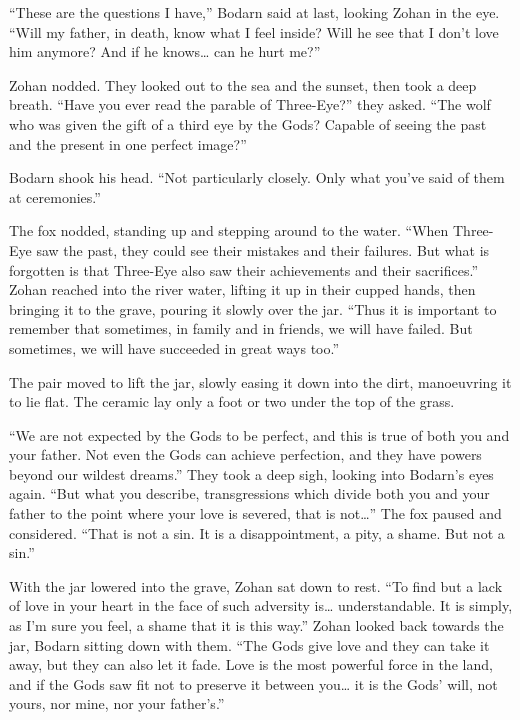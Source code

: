 ``These are the questions I have,'' Bodarn said at last, looking Zohan in the eye. ``Will my father, in death, know what I feel inside? Will he see that I don't love him anymore? And if he knows\ldots{} can he hurt me?''

Zohan nodded. They looked out to the sea and the sunset, then took a deep breath. ``Have you ever read the parable of Three-Eye?'' they asked. ``The wolf who was given the gift of a third eye by the Gods? Capable of seeing the past and the present in one perfect image?''

Bodarn shook his head. ``Not particularly closely. Only what you've said of them at ceremonies.''

The fox nodded, standing up and stepping around to the water. ``When Three-Eye saw the past, they could see their mistakes and their failures. But what is forgotten is that Three-Eye also saw their achievements and their sacrifices.'' Zohan reached into the river water, lifting it up in their cupped hands, then bringing it to the grave, pouring it slowly over the jar. ``Thus it is important to remember that sometimes, in family and in friends, we will have failed. But sometimes, we will have succeeded in great ways too.''

The pair moved to lift the jar, slowly easing it down into the dirt, manoeuvring it to lie flat. The ceramic lay only a foot or two under the top of the grass.

``We are not expected by the Gods to be perfect, and this is true of both you and your father. Not even the Gods can achieve perfection, and they have powers beyond our wildest dreams.'' They took a deep sigh, looking into Bodarn's eyes again. ``But what you describe, transgressions which divide both you and your father to the point where your love is severed, that is not\ldots'' The fox paused and considered. ``That is not a sin. It is a disappointment, a pity, a shame. But not a sin.''

With the jar lowered into the grave, Zohan sat down to rest. ``To find but a lack of love in your heart in the face of such adversity is\ldots{} understandable. It is simply, as I'm sure you feel, a shame that it is this way.'' Zohan looked back towards the jar, Bodarn sitting down with them. ``The Gods give love and they can take it away, but they can also let it fade. Love is the most powerful force in the land, and if the Gods saw fit not to preserve it between you\ldots{} it is the Gods' will, not yours, nor mine, nor your father's.''

